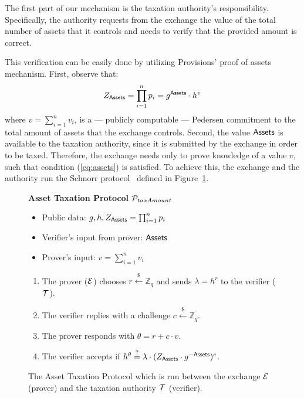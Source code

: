 The first part of our mechanism is the taxation authority's responsibility.
Specifically, the authority requests from the exchange the value of the total
number of assets that it controls and needs to verify that the provided amount
is correct.

This verification can be easily done by utilizing Provisions' proof of
assets mechanism. First, observe that:
\begin{align}
    Z_{\mathsf{Assets}} = \prod_{i = 1}^n p_i = g^{\mathsf{Assets}} \cdot h^v \label{eq:assets}
\end{align}
where $v = {\sum_{i = 1}^n v_i}$, is a --- publicly computable --- Pedersen
commitment to the total amount of assets that the exchange controls. Second,
the value $\mathsf{Assets}$ is available to the taxation authority, since it is
submitted by the exchange in order to be taxed.  Therefore, the exchange needs
only to prove knowledge of a value $v$, such that condition (\ref{eq:assets}) is
satisfied. To achieve this, the exchange and the authority run the Schnorr
protocol~\cite{C:Schnorr89} defined in Figure~\ref{fig:taxation_auth_proto}.

\begin{figure}[h]
\begin{mdframed}

\begin{center}
    \textbf{Asset Taxation Protocol} $\mathcal{P}_{taxAmount}$
\end{center}

    \begin{itemize}
        \item Public data: $g, h, Z_{\mathsf{Assets}} = \prod_{i = 1}^n p_i$
        \item Verifier's input from prover: $\mathsf{Assets}$
        \item Prover's input: $v = \sum_{i = 1}^n v_i$
    \end{itemize}

    \begin{enumerate}
        \item The prover ($\mathcal{E}$) chooses $r \xleftarrow{\$} \mathbb{Z}_q$
            and sends $\lambda = h^r$ to the verifier ($\mathcal{T}$).
        \item The verifier replies with a challenge $c \xleftarrow{\$} \mathbb{Z}_q$.
        \item The prover responds with $\theta = r + c \cdot v$.
        \item The verifier accepts if $h^\theta \stackrel{?}{=} \lambda \cdot (Z_{\mathsf{Assets}} \cdot g^{-\mathsf{Assets}})^c$.
    \end{enumerate}

\end{mdframed}
\caption{
    The Asset Taxation Protocol which is run between the exchange $\mathcal{E}$
    (prover) and the taxation authority $\mathcal{T}$ (verifier).
}
\label{fig:taxation_auth_proto}
\end{figure}

